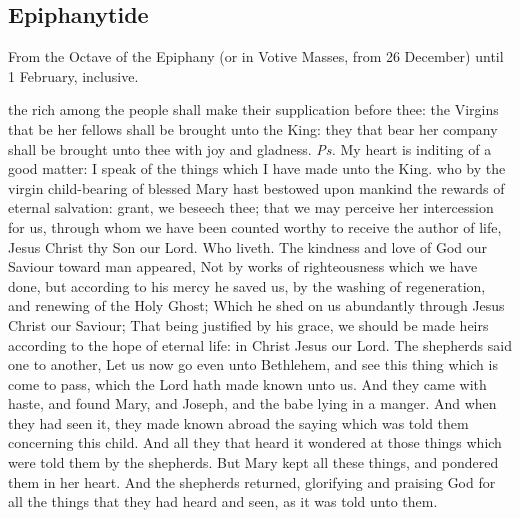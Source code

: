 \subsection{Epiphanytide}
\begin{rubric}
    {From the Octave of the Epiphany (or in Votive Masses, from 26 December) until 1 February, inclusive.}
\end{rubric}


\introit
{} the rich among the people shall make their supplication before thee: the Virgins that be her fellows shall be brought unto the King: they that bear her company shall be brought unto thee with joy and gladness. \textit{Ps.} My heart is inditing of a good matter: I speak of the things which I have made unto the King.
\collect
{} who by the virgin child-bearing of blessed Mary hast bestowed upon mankind the rewards of eternal salvation: grant, we beseech thee; that we may perceive her intercession for us, through whom we have been counted worthy to receive the author of life, Jesus Christ thy Son our Lord. Who liveth.
 The kindness and love of God our Saviour toward man appeared, Not by works of righteousness which we have done, but according to his mercy he saved us, by the washing of regeneration, and renewing of the Holy Ghost; Which he shed on us abundantly through Jesus Christ our Saviour; That being justified by his grace, we should be made heirs according to the hope of eternal life: in Christ Jesus our Lord.
 The shepherds said one to another, Let us now go even unto Bethlehem, and see this thing which is come to pass, which the Lord hath made known unto us. And they came with haste, and found Mary, and Joseph, and the babe lying in a manger. And when they had seen it, they made known abroad the saying which was told them concerning this child. And all they that heard it wondered at those things which were told them by the shepherds. But Mary kept all these things, and pondered them in her heart. And the shepherds returned, glorifying and praising God for all the things that they had heard and seen, as it was told unto them.

